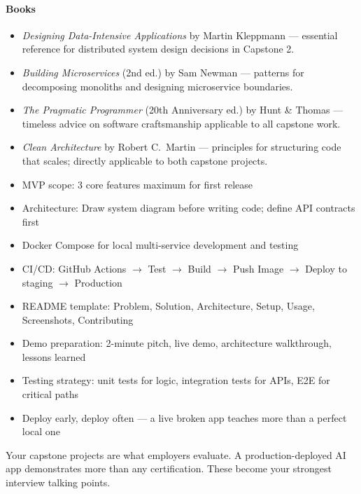 \documentclass[11pt, a4paper, oneside]{report}
\begin{document}
\paragraph{Books}
\begin{itemize}[leftmargin=*]
\item \emph{Designing Data-Intensive Applications} by Martin Kleppmann --- essential reference for distributed system design decisions in Capstone 2.
\item \emph{Building Microservices} (2nd ed.) by Sam Newman --- patterns for decomposing monoliths and designing microservice boundaries.
\item \emph{The Pragmatic Programmer} (20th Anniversary ed.) by Hunt \& Thomas --- timeless advice on software craftsmanship applicable to all capstone work.
\item \emph{Clean Architecture} by Robert C.\ Martin --- principles for structuring code that scales; directly applicable to both capstone projects.
\end{itemize}


\begin{cheatsheetbox}
\begin{itemize}[leftmargin=*]
\item MVP scope: 3 core features maximum for first release
\item Architecture: Draw system diagram before writing code; define API contracts first
\item Docker Compose for local multi-service development and testing
\item CI/CD: GitHub Actions $\to$ Test $\to$ Build $\to$ Push Image $\to$ Deploy to staging $\to$ Production
\item README template: Problem, Solution, Architecture, Setup, Usage, Screenshots, Contributing
\item Demo preparation: 2-minute pitch, live demo, architecture walkthrough, lessons learned
\item Testing strategy: unit tests for logic, integration tests for APIs, E2E for critical paths
\item Deploy early, deploy often --- a live broken app teaches more than a perfect local one
\end{itemize}
\end{cheatsheetbox}

\begin{realworldbox}
Your capstone projects are what employers evaluate. A production-deployed AI app demonstrates more than any certification. These become your strongest interview talking points.
\end{realworldbox}
\end{document}
